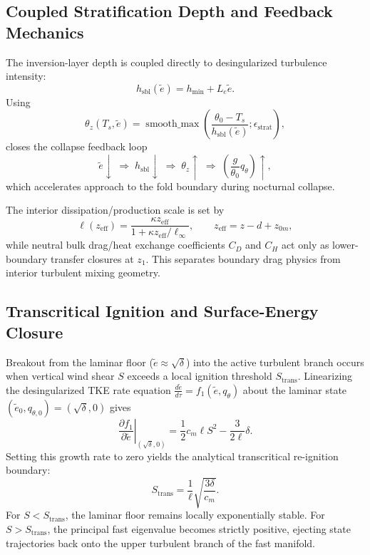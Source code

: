\documentclass[11pt]{article}
\begin{document}
\subsection{Coupled Stratification Depth and Feedback Mechanics}
\label{subsec:coupled_sbl_depth}

The inversion-layer depth is coupled directly to desingularized turbulence intensity:
\begin{equation}
h_{\text{sbl}}(\tilde{e}) = h_{\min} + L_e\tilde{e}.
\label{eq:dynamic_h_sbl}
\end{equation}
Using
\begin{equation}
\theta_z(T_s,\tilde{e}) = \operatorname{smooth\_max}\!\left(\frac{\theta_0-T_s}{h_{\text{sbl}}(\tilde{e})};\epsilon_{\text{strat}}\right),
\label{eq:theta_z_dynamic_hsbl}
\end{equation}
closes the collapse feedback loop
\begin{equation}
\tilde{e}\downarrow\;\Rightarrow\;h_{\text{sbl}}\downarrow\;\Rightarrow\;\theta_z\uparrow\;\Rightarrow\;\left(\frac{g}{\theta_0}q_\theta\right)\uparrow,
\end{equation}
which accelerates approach to the fold boundary during nocturnal collapse.

The interior dissipation/production scale is set by
\begin{equation}
\ell(z_{\text{eff}})=\frac{\kappa z_{\text{eff}}}{1+\kappa z_{\text{eff}}/\ell_\infty},
\qquad
z_{\text{eff}}=z-d+z_{0m},
\label{eq:zeff_blackadar}
\end{equation}
while neutral bulk drag/heat exchange coefficients $C_D$ and $C_H$ act only as lower-boundary transfer closures at $z_1$. This separates boundary drag physics from interior turbulent mixing geometry.

\subsection{Transcritical Ignition and Surface-Energy Closure}
\label{subsec:ignition_and_flux}

Breakout from the laminar floor ($\tilde{e} \approx \sqrt{\delta}$) into the active turbulent branch occurs when vertical wind shear $S$ exceeds a local ignition threshold $S_{\text{trans}}$. Linearizing the desingularized TKE rate equation $\frac{d\tilde{e}}{d\tau} = f_1(\tilde{e}, q_\theta)$ about the laminar state $(\tilde{e}_0, q_{\theta,0}) = (\sqrt{\delta}, 0)$ gives
\begin{equation}
\left.\frac{\partial f_1}{\partial \tilde{e}}\right\rvert_{(\sqrt{\delta}, 0)} = \frac{1}{2} c_m \ell S^2 - \frac{3}{2\ell}\delta.
\label{eq:tke_linearization}
\end{equation}
Setting this growth rate to zero yields the analytical transcritical re-ignition boundary:
\begin{equation}
S_{\text{trans}} = \frac{1}{\ell}\sqrt{\frac{3\delta}{c_m}}.
\label{eq:S_trans}
\end{equation}
For $S < S_{\text{trans}}$, the laminar floor remains locally exponentially stable. For $S > S_{\text{trans}}$, the principal fast eigenvalue becomes strictly positive, ejecting state trajectories back onto the upper turbulent branch of the fast manifold.
\end{document}
